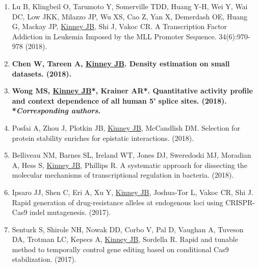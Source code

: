 \documentclass[10pt,hidelinks]{article}
\begin{document}
\begin{enumerate}
\item Lu B, Klingbeil O, Tarumoto Y, Somerville TDD, Huang Y-H, Wei Y, Wai DC, Low JKK, Milazzo JP, Wu XS, Cao Z, Yan X, Demerdash OE, Huang G, Mackay JP, \underline{Kinney JB}, Shi J, Vakoc CR.  A Transcription Factor Addiction in Leukemia Imposed by the MLL Promoter Sequence.  34(6):970-978 (2018). 

\item \textbf{Chen W, Tareen A, \underline{Kinney JB}. Density estimation on small datasets.  (2018). }

\item \textbf{Wong MS, \underline{Kinney JB}*, Krainer AR*. Quantitative activity profile and context dependence of all human 5' splice sites.  (2018). *\textit{Corresponding authors}.}

\item Posfai A, Zhou J, Plotkin JB, \underline{Kinney JB}, McCandlish DM. Selection for protein stability enriches for epistatic interactions.  (2018). 

\item Belliveau NM, Barnes SL, Ireland WT, Jones DJ, Sweredoski MJ, Moradian A, Hess S, \underline{Kinney JB}, Phillips R. A systematic approach for dissecting the molecular mechanisms of transcriptional regulation in bacteria.  (2018). 

\item Ipsaro JJ, Shen C, Eri A, Xu Y, \underline{Kinney JB}, Joshua-Tor L, Vakoc CR, Shi J. Rapid generation of drug-resistance alleles at endogenous loci using CRISPR-Cas9 indel mutagenesis.  (2017).

\item Senturk S, Shirole NH, Nowak DD, Corbo V, Pal D, Vaughan A, Tuveson DA, Trotman LC, Kepecs A, \underline{Kinney JB}, Sordella R. Rapid and tunable method to temporally control gene editing based on conditional Cas9 stabilization.  (2017).


\end{enumerate}
\end{document}
